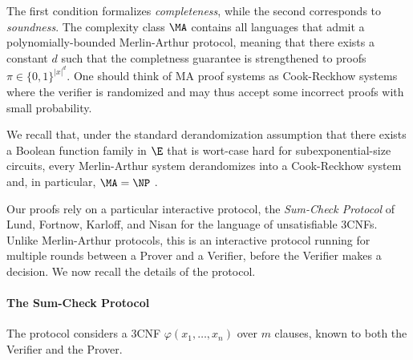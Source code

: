 \documentclass[11pt]{article}
\theoremstyle{definition}
\theoremstyle{plain}
\theoremstyle{remark}
\begin{document}
The first condition formalizes \emph{completeness}, while the second corresponds to \emph{soundness}.
The complexity class $\MA$ contains all languages that admit a polynomially-bounded Merlin-Arthur protocol, meaning that there exists a constant $d$ such that the completness guarantee is strengthened to proofs $\pi \in \{0,1\}^{|x|^d}$. One should think of MA proof systems as Cook-Reckhow systems where the verifier is randomized and may thus accept some incorrect proofs with small probability.

We recall that, under the standard derandomization assumption that there exists a Boolean function family in $\E$ that is wort-case hard for subexponential-size circuits, every Merlin-Arthur system derandomizes into a Cook-Reckhow system and, in particular, $\MA = \NP$ \cite{NW94, IW97}.

Our proofs rely on a particular interactive protocol, the \emph{Sum-Check Protocol} of Lund, Fortnow, Karloff, and Nisan \cite{LFKN92-SumCheck} for the language of unsatisfiable 3CNFs. Unlike Merlin-Arthur protocols, this is an interactive protocol running for multiple rounds between a Prover and a Verifier, before the Verifier makes a decision. We now recall the details of the protocol.

\paragraph{The Sum-Check Protocol \cite{LFKN92-SumCheck}} The protocol considers a 3CNF $\varphi(x_1, \dots, x_n)$ over $m$ clauses, known to both the Verifier and the Prover.
\end{document}

